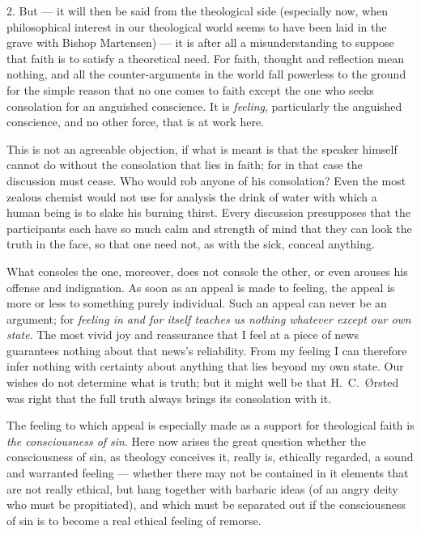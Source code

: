 \documentclass[12pt,a4paper,openany]{book}
\newcommand{\opage}[1]{\marginnote{\footnotesize\textit{[#1]}}}
\begin{document}
2. But --- it will then be said from the theological side (especially
now, when philosophical interest in our theological world seems to have been
laid in the grave with Bishop Martensen) --- it is after all a misunderstanding
to suppose that faith is to satisfy a theoretical need. For faith, thought and
reflection mean nothing, and all the counter-arguments in the world fall
powerless to the ground for the simple reason that no one comes to faith except
the one who seeks consolation for an anguished conscience. It is
\emph{feeling}, particularly the anguished conscience, and no other force, that is at work here.

This is not an agreeable objection, if what is meant is that the speaker himself
cannot do without the consolation that lies in faith; for in that case the
discussion must cease. Who would rob anyone of his consolation? Even the most
zealous chemist would not use for analysis the drink of water
\opage{213}with which a human
being is to slake his burning thirst. Every discussion presupposes that the
participants each have so much calm and strength of mind that they can look the
truth in the face, so that one need not, as with the sick, conceal anything.

What consoles the one, moreover, does not console the other, or even arouses his
offense and indignation. As soon as an appeal is made to feeling, the appeal is
more or less to something purely individual. Such an appeal can never be an
argument; for \emph{feeling in and for itself teaches us nothing whatever except our
own state}. The most vivid joy and reassurance that I feel at a piece of news
guarantees nothing about that news's reliability. From my feeling I can
therefore infer nothing with certainty about anything that lies beyond my own
state. Our wishes do not determine what is truth; but it might well be that
H.~C.~Ørsted was right that the full truth always brings its consolation with
it.

The feeling to which appeal is especially made as a support for theological
faith is \emph{the consciousness of sin}. Here now arises the great question whether
the consciousness of sin, as theology conceives it, really is, ethically
regarded, a sound and warranted feeling --- whether there may not be contained
in it elements that are not really ethical, but hang together with barbaric
ideas (of an angry deity who must be propitiated), and which must be
separated out if the consciousness of sin is to become a real ethical feeling of
remorse.
\end{document}
